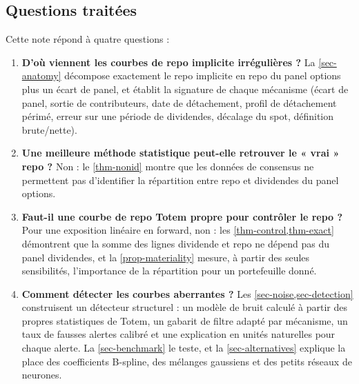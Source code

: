 \subsection{Questions traitées}
Cette note répond à quatre questions :
\begin{enumerate}[label=(\alph*)]
\item \textbf{D'où viennent les courbes de repo implicite irrégulières ?} La \cref{sec-anatomy} décompose exactement
le repo implicite en repo du panel options plus un écart de panel, et établit la signature de chaque mécanisme
(écart de panel, sortie de contributeurs, date de détachement, profil de détachement périmé, erreur sur une période de
dividendes, décalage du spot, définition brute/nette).
\item \textbf{Une meilleure méthode statistique peut-elle retrouver le « vrai » repo ?} Non : le \cref{thm-nonid}
montre que les données de consensus ne permettent pas d'identifier la répartition entre repo et dividendes du panel
options.
\item \textbf{Faut-il une courbe de repo Totem propre pour contrôler le repo ?} Pour une exposition linéaire en
forward, non : les \cref{thm-control,thm-exact} démontrent que la somme des lignes dividende et repo ne dépend pas
du panel dividendes, et la \cref{prop-materiality} mesure, à partir des seules sensibilités, l'importance de la
répartition pour un portefeuille donné.
\item \textbf{Comment détecter les courbes aberrantes ?} Les \cref{sec-noise,sec-detection} construisent un
détecteur structurel : un modèle de bruit calculé à partir des propres statistiques de Totem, un gabarit de filtre
adapté par mécanisme, un taux de fausses alertes calibré et une explication en unités naturelles pour chaque alerte.
La \cref{sec-benchmark} le teste, et la \cref{sec-alternatives} explique la place des coefficients B-spline, des
mélanges gaussiens et des petits réseaux de neurones.
\end{enumerate}

